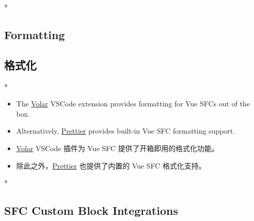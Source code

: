 \begin{paracol}{2}
 
\switchcolumn[0]*%
\subsection{Formatting}
\switchcolumn
\subsection{格式化}
\switchcolumn[0]*%
\begin{itemize}
\item
  The \href{https://github.com/johnsoncodehk/volar}{Volar} VSCode
  extension provides formatting for Vue SFCs out of the box.
\item
  Alternatively, \href{https://prettier.io/}{Prettier} provides built-in
  Vue SFC formatting support.
\end{itemize}
\switchcolumn
\begin{itemize}
\item
  \href{https://github.com/johnsoncodehk/volar}{Volar} VSCode 插件为 Vue
  SFC 提供了开箱即用的格式化功能。
\item
  除此之外，\href{https://prettier.io/}{Prettier} 也提供了内置的 Vue SFC
  格式化支持。
\end{itemize}
\switchcolumn[0]*%
\subsection{SFC Custom Block Integrations}
\switchcolumn

\end{paracol}
